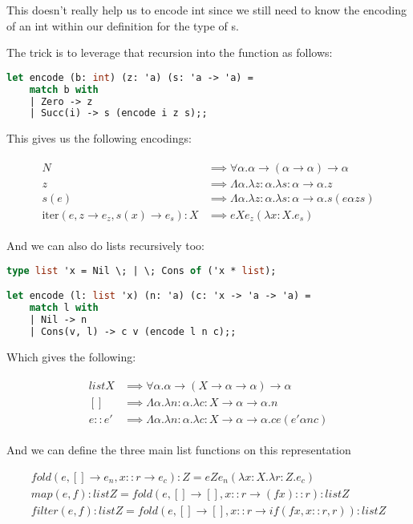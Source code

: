 \documentclass{article}
\newcommand{\inlineeq}[1]{
    \vspace{-2em}
    \begin{gather*}
    #1
    \end{gather*}
    \vspace{-2em}
}
\begin{document}
This doesn't really help us to encode int since we still need to know the encoding of an int within our definition for the type of s.

The trick is to leverage that recursion into the function as follows:

\begin{lstlisting}[language=ML]
let encode (b: int) (z: 'a) (s: 'a -> 'a) = 
	match b with
	| Zero -> z
	| Succ(i) -> s (encode i z s);;
\end{lstlisting}

This gives us the following encodings:

\inlineeq{
\begin{split}
N &\implies \forall \alpha . \alpha  \to (\alpha  \to \alpha ) \to \alpha \\
z &\implies \Lambda \alpha . \lambda z : \alpha . \lambda s : \alpha  \to \alpha . z\\
s(e) &\implies \Lambda \alpha . \lambda z : \alpha . \lambda s : \alpha  \to \alpha . s (e \alpha  z s)\\
\textrm{iter}(e, z \to e_z, s(x) \to e_s) : X &\implies e X e_z (\lambda x : X. e_s)
\end{split}
}

And we can also do lists recursively too:

\begin{lstlisting}[language=ML]
type list 'x = Nil \; | \; Cons of ('x * list);

let encode (l: list 'x) (n: 'a) (c: 'x -> 'a -> 'a) = 
	match l with
	| Nil -> n
	| Cons(v, l) -> c v (encode l n c);;
\end{lstlisting}

Which gives the following:

\inlineeq{
\begin{split}
list X &\implies \forall \alpha . \alpha  \to (X \to \alpha  \to \alpha ) \to \alpha \\
[] &\implies \Lambda \alpha . \lambda n : \alpha . \lambda c : X \to \alpha  \to \alpha . n\\
e :: e' &\implies \Lambda \alpha . \lambda n : \alpha . \lambda c : X \to \alpha  \to \alpha . c e (e' \alpha  n c)
\end{split}
}

And we can define the three main list functions on this representation

\inlineeq{
fold(e, [] \to e_n, x :: r \to e_c) : Z = e Z e_n (\lambda x : X. \lambda r : Z. e_c)\\
map(e, f): listZ = fold(e, [] \to [], x::r \to (f x) :: r): listZ \\
filter(e, f): listZ = fold(e, [] \to [], x::r \to if(f x, x :: r, r)): listZ \\
}
\end{document}
